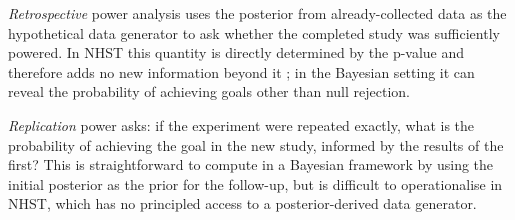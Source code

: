 \textit{Retrospective} power analysis uses the posterior from already-collected data as
the hypothetical data generator to ask whether the completed study was sufficiently
powered. In NHST this quantity is directly determined by the p-value and therefore adds
no new information beyond it \citep{hoenig2001}; in the Bayesian setting it can reveal
the probability of achieving goals other than null rejection.

\textit{Replication} power asks: if the experiment were repeated exactly, what is the
probability of achieving the goal in the new study, informed by the results of the
first? This is straightforward to compute in a Bayesian framework by using the initial
posterior as the prior for the follow-up, but is difficult to operationalise in NHST,
which has no principled access to a posterior-derived data generator.
